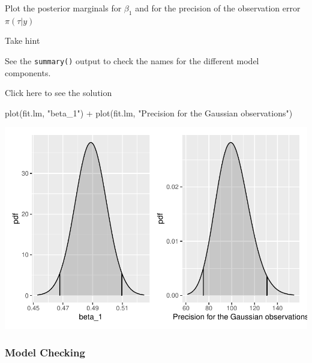 \documentclass[
  letterpaper,
  DIV=11,
  numbers=noendperiod]{scrartcl}
\newenvironment{Shaded}{\begin{snugshade}}{\end{snugshade}}
\newcommand{\FunctionTok}[1]{\textcolor[rgb]{0.28,0.35,0.67}{#1}}
\newcommand{\NormalTok}[1]{\textcolor[rgb]{0.00,0.23,0.31}{#1}}
\newcommand{\SpecialCharTok}[1]{\textcolor[rgb]{0.37,0.37,0.37}{#1}}
\newcommand{\StringTok}[1]{\textcolor[rgb]{0.13,0.47,0.30}{#1}}
\begin{document}
\begin{tcolorbox}[enhanced jigsaw, title={Task}, titlerule=0mm, bottomrule=.15mm, coltitle=black, opacityback=0, toprule=.15mm, colbacktitle=quarto-callout-warning-color!10!white, bottomtitle=1mm, colback=white, breakable, rightrule=.15mm, opacitybacktitle=0.6, arc=.35mm, toptitle=1mm, leftrule=.75mm, left=2mm, colframe=quarto-callout-warning-color-frame]

Plot the posterior marginals for \(\beta_1\) and for the precision of
the observation error \(\pi(\tau|y)\)

Take hint

See the \texttt{summary()} output to check the names for the different
model components.

Click here to see the solution

\begin{Shaded}
\begin{Highlighting}[]
\FunctionTok{plot}\NormalTok{(fit.lm, }\StringTok{"beta\_1"}\NormalTok{) }\SpecialCharTok{+}
\FunctionTok{plot}\NormalTok{(fit.lm, }\StringTok{"Precision for the Gaussian observations"}\NormalTok{)}
\end{Highlighting}
\end{Shaded}

\begin{center}
\includegraphics{day1_practical_2_files/figure-pdf/unnamed-chunk-11-1.pdf}
\end{center}

\end{tcolorbox}

\subsubsection{Model Checking}\label{model-checking}
\end{document}
